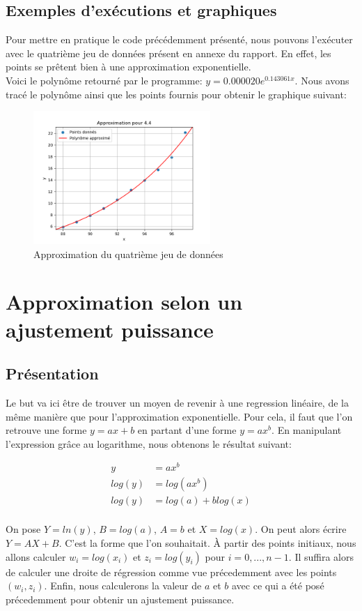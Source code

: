 \subsection{Exemples d'exécutions et graphiques}
Pour mettre en pratique le code précédemment présenté, nous pouvons l'exécuter avec le quatrième jeu de données présent en annexe du rapport. En effet, les points se prêtent bien à une approximation exponentielle.\\
Voici le polynôme retourné par le programme: $y=0.000020e^{0.143061x}$. Nous avons tracé le polynôme ainsi que les points fournis pour obtenir le graphique suivant:\\
\begin{figure}[H]
    \centering
    \includegraphics[width=0.6\textwidth]{sources/Corentin/approximationC/results/graphs/44.png}
    \caption{Approximation du quatrième jeu de données}
\end{figure}
\section{Approximation selon un ajustement puissance}
\subsection{Présentation}
Le but va ici être de trouver un moyen de revenir à une regression linéaire, de la même manière que pour l'approximation exponentielle. Pour cela, il faut que l'on retrouve une forme $y=ax+b$ en partant d'une forme $y=ax^b$. En manipulant l'expression grâce au logarithme, nous obtenons le résultat suivant: \\
\begin{center}
    \begin{align*}
        y&=ax^b\\
        log(y)&=log(ax^b)\\
        log(y)&=log(a)+blog(x) \\
    \end{align*}
\end{center}
On pose $Y=ln(y)$, $B=log(a)$, $A=b$ et $X=log(x)$. On peut alors écrire $Y=AX+B$. C'est la forme que l'on souhaitait.
À partir des points initiaux, nous allons calculer $w_i=log(x_i)$ et $z_i=log(y_i)$ pour $i=0,..., n-1$. Il suffira alors de calculer une droite de régression comme vue précedemment avec les points $(w_i, z_i)$. Enfin, nous calculerons la valeur de $a$ et $b$ avec ce qui a été posé précedemment pour obtenir un ajustement puissance. 
\newpage
